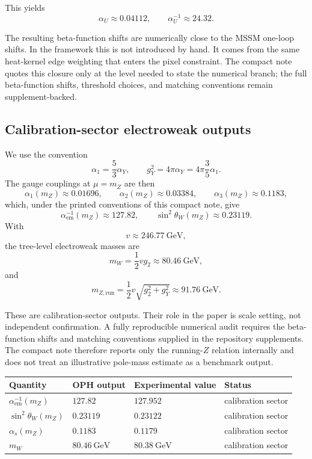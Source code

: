 \documentclass[11pt]{article}
\begin{document}
This yields
\[
\alpha_U\approx 0.04112,
\qquad
\alpha_U^{-1}\approx 24.32.
\]

The resulting beta-function shifts are numerically close to the MSSM one-loop shifts. In the framework this is not introduced by hand. It comes from the same heat-kernel edge weighting that enters the pixel constraint. The compact note quotes this closure only at the level needed to state the numerical branch; the full beta-function shifts, threshold choices, and matching conventions remain supplement-backed.

\subsection{Calibration-sector electroweak outputs}

We use the convention
\[
\alpha_1=\frac53\alpha_Y,
\qquad
g_Y^2=4\pi\alpha_Y=4\pi\frac35\alpha_1.
\]
The gauge couplings at $\mu=m_Z$ are then
\[
\alpha_1(m_Z)\approx 0.01696,\qquad
\alpha_2(m_Z)\approx 0.03384,\qquad
\alpha_3(m_Z)\approx 0.1183,
\]
which, under the printed conventions of this compact note, give
\[
\alpha_{\mathrm{em}}^{-1}(m_Z)\approx 127.82,\qquad
\sin^2\theta_W(m_Z)\approx 0.23119.
\]
With
\[
v\approx 246.77\ \mathrm{GeV},
\]
the tree-level electroweak masses are
\[
m_W=\frac12 v g_2 \approx 80.46\ \mathrm{GeV},
\]
and
\[
m_{Z,\mathrm{run}}=\frac12v\sqrt{g_2^2+g_Y^2}\approx 91.76\ \mathrm{GeV}.
\]

These are calibration-sector outputs. Their role in the paper is scale setting, not independent confirmation. A fully reproducible numerical audit requires the beta-function shifts and matching conventions supplied in the repository supplements. The compact note therefore reports only the running-$Z$ relation internally and does not treat an illustrative pole-mass estimate as a benchmark output.

\begingroup
\footnotesize
\begin{longtable}{@{}p{}p{}p{}p{}@{}}
\toprule
Quantity & OPH output & Experimental value & Status \\
\midrule
\endhead
\bottomrule
\endfoot
$\alpha_{\mathrm{em}}^{-1}(m_Z)$ & $127.82$ & $127.952$ & calibration sector \\
$\sin^2\theta_W(m_Z)$ & $0.23119$ & $0.23122$ & calibration sector \\
$\alpha_s(m_Z)$ & $0.1183$ & $0.1179$ & calibration sector \\
$m_W$ & $80.46~\mathrm{GeV}$ & $80.38~\mathrm{GeV}$ & calibration sector \\
\end{longtable}
\endgroup
\end{document}
